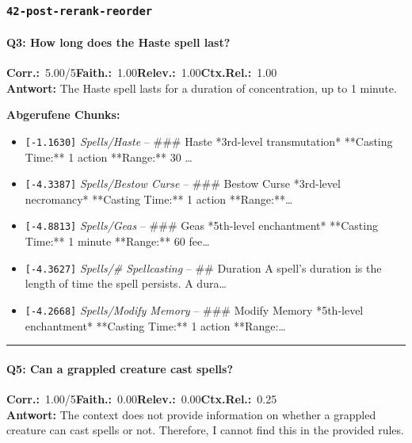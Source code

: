 \subsubsection*{\texttt{42-post-rerank-reorder}}
\label{app:samples:42_post_rerank_reorder}

\paragraph{Q3: How long does the Haste spell last?}
\noindent \textbf{Corr.:}~5.00/5\quad \textbf{Faith.:}~1.00\quad \textbf{Relev.:}~1.00\quad \textbf{Ctx.Rel.:}~1.00\\

\noindent\textbf{Antwort:} The Haste spell lasts for a duration of concentration, up to 1 minute.

\noindent\textbf{Abgerufene Chunks:}
\begin{itemize}[noitemsep, topsep=2pt]
  \item[\textbf{\#1}] \texttt{[-1.1630]} \textit{Spells/Haste} -- \#\#\# Haste  *3rd-level transmutation*  **Casting Time:** 1 action  **Range:** 30 \ldots
  \item[\textbf{\#2}] \texttt{[-4.3387]} \textit{Spells/Bestow Curse} -- \#\#\# Bestow Curse  *3rd-level necromancy*  **Casting Time:** 1 action  **Range:**\ldots
  \item[\textbf{\#3}] \texttt{[-4.8813]} \textit{Spells/Geas} -- \#\#\# Geas  *5th-level enchantment*  **Casting Time:** 1 minute  **Range:** 60 fee\ldots
  \item[\textbf{\#4}] \texttt{[-4.3627]} \textit{Spells/# Spellcasting} -- \#\# Duration  A spell's duration is the length of time the spell persists. A dura\ldots
  \item[\textbf{\#5}] \texttt{[-4.2668]} \textit{Spells/Modify Memory} -- \#\#\# Modify Memory  *5th-level enchantment*  **Casting Time:** 1 action  **Range:\ldots
\end{itemize}
\vspace{4pt}
\hrule
\vspace{6pt}

\paragraph{Q5: Can a grappled creature cast spells?}
\noindent \textbf{Corr.:}~1.00/5\quad \textbf{Faith.:}~0.00\quad \textbf{Relev.:}~0.00\quad \textbf{Ctx.Rel.:}~0.25\\

\noindent\textbf{Antwort:} The context does not provide information on whether a grappled creature can cast spells or not. Therefore, I cannot find this in the provided rules.


